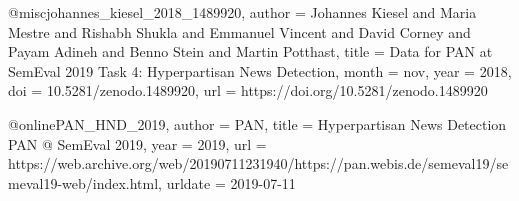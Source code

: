@misc{johannes_kiesel_2018_1489920,
  author       = {Johannes Kiesel and
                  Maria Mestre and
                  Rishabh Shukla and
                  Emmanuel Vincent and
                  David Corney and
                  Payam Adineh and
                  Benno Stein and
                  Martin Potthast},
  title        = {{Data for PAN at SemEval 2019 Task 4: Hyperpartisan 
                   News Detection}},
  month        = nov,
  year         = 2018,
  doi          = {10.5281/zenodo.1489920},
  url          = {https://doi.org/10.5281/zenodo.1489920}
}

@online{PAN_HND_2019,
  author = {PAN},
  title = {{Hyperpartisan News Detection} PAN @ SemEval 2019},
  year = 2019,
  url = {https://web.archive.org/web/20190711231940/https://pan.webis.de/semeval19/semeval19-web/index.html},
  urldate = {2019-07-11}
}

